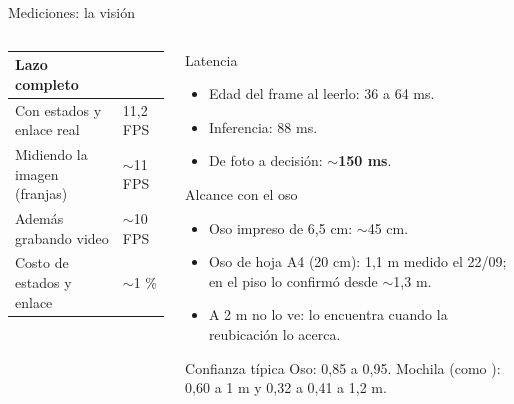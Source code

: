 \begin{frame}{Mediciones: la visión}
{\begin{columns}[T,onlytextwidth]
\begin{column}{0.485\textwidth}
      \vspace{0.5em}
      \begin{tabular}{L{3.6cm}L{2.6cm}}
        \toprule
        \textbf{Lazo completo} & \\
        \midrule
        Con estados y enlace real & 11,2 FPS \\
        Midiendo la imagen (franjas) & $\sim$11 FPS \\
        Además grabando video & $\sim$10 FPS \\
        Costo de estados y enlace & $\sim$1 \% \\
        \bottomrule
      \end{tabular}
    \end{column}
    \begin{column}{0.485\textwidth}
      \begin{block}{Latencia}
        \begin{itemize}
          \item Edad del frame al leerlo: 36 a 64 ms.
          \item Inferencia: 88 ms.
          \item De foto a decisión: \textbf{$\sim$150 ms}.
        \end{itemize}
      \end{block}
      \begin{block}{Alcance con el oso}
        \begin{itemize}
          \item Oso impreso de 6,5 cm: $\sim$45 cm.
          \item Oso de hoja A4 (20 cm): 1,1 m medido el 22/09; en el piso lo
                confirmó desde $\sim$1,3 m.
          \item A 2 m no lo ve: lo encuentra cuando la reubicación lo acerca.
        \end{itemize}
      \end{block}
      \begin{block}{Confianza típica}
        Oso: 0,85 a 0,95. Mochila (como ): 0,60 a 1 m y 0,32 a
        0,41 a 1,2 m.
      \end{block}
    \end{column}
  \end{columns}}
\end{frame}

